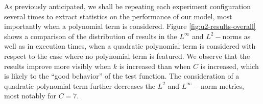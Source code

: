 \documentclass[12pt]{report} %
\begin{document}
As previously anticipated, we shall be repeating each experiment configuration several times to extract statistics on the performance of our model, most importantly when a polynomial term is considered. Figure \ref{fig:u2-results-overall} shows a comparison of the distribution of results in the $L^\infty$ and $L^2-$norms as well as in execution times, when a quadratic polynomial term is considered with respect to the case where no polynomial term is featured. We observe that the results improve more visibly when $k$ is increased than when $C$ is increased, which is likely to the ``good behavior'' of the test function. The consideration of a quadratic polynomial term further decreases the $L^2$ and $L^\infty-$norm metrics, most notably for $C=7$.

\begin{figure}
  \hspace*{-1cm}
  \begin{tabular}{cccccc}

\end{tabular}
\end{figure}
\end{document}
